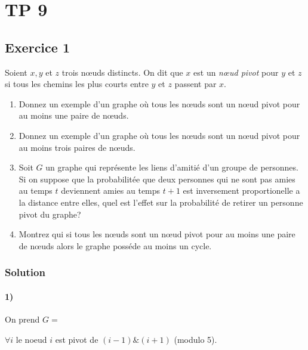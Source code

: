 \section{TP 9}




\subsection*{Exercice 1}
Soient $x, y$ et $z$ trois n\oe{}uds distincts. On dit que $x$ est un \emph{n\oe{}ud pivot} pour $y$ et $z$ si tous les chemins les plus courts entre $y$ et $z$ passent par $x$.

\begin{enumerate}
\item Donnez un exemple d'un graphe o\`{u} tous les n\oe{}uds sont un n\oe{}ud pivot pour au moins une paire de n\oe{}uds.
\item Donnez un exemple d'un graphe o\`{u} tous les n\oe{}uds sont un n\oe{}ud pivot pour au moins trois paires de n\oe{}uds.
\item Soit $G$ un graphe qui repr\'{e}sente les liens d'amiti\'{e} d'un groupe de personnes. Si on suppose que la probabilit\'{e}e que deux personnes qui ne sont pas amies au 
temps $t$ deviennent amies au temps $t + 1$ est inversement proportionelle a la distance entre elles, quel est l'effet sur la probabilit\'{e} de retirer un personne pivot du graphe? 
\item Montrez qui si tous les n\oe{}uds sont un n\oe{}ud pivot pour au moins une paire de n\oe{}uds alors le graphe poss\'{e}de au moins un cycle.
\end{enumerate}

\subsubsection*{Solution}

\paragraph{1)} On prend $G = $
\begin{center}  
\end{center}
$\forall i$ le noeud $i$ est pivot de $(i-1)\&(i+1)$ (modulo 5).

